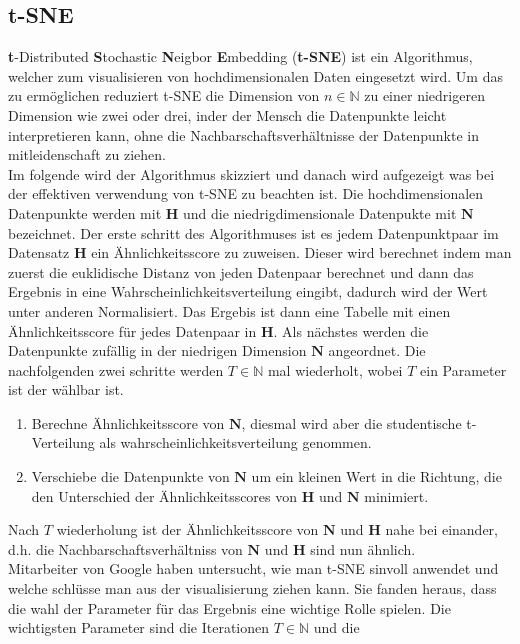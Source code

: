 \documentclass[12pt,letterpaper,ngerman]{article}
\begin{document}
\subsection{t-SNE}
{\bf t}-Distributed {\bf S}tochastic {\bf N}eigbor {\bf E}mbedding ({\bf t-SNE})
ist ein Algorithmus, welcher zum visualisieren von hochdimensionalen Daten 
eingesetzt wird. Um das zu ermöglichen reduziert t-SNE die Dimension von 
$n \in \mathbb{N}$ zu einer niedrigeren Dimension wie zwei oder drei, inder
der Mensch die Datenpunkte leicht interpretieren kann, ohne die 
Nachbarschaftsverhältnisse der Datenpunkte in mitleidenschaft zu ziehen.\\
Im folgende wird der Algorithmus skizziert und danach wird aufgezeigt was bei 
der effektiven verwendung von t-SNE zu beachten ist. Die hochdimensionalen 
Datenpunkte werden mit $\mathbf{H}$ und die niedrigdimensionale Datenpukte mit
$\mathbf{N}$ bezeichnet. Der erste schritt des Algorithmuses ist es 
jedem Datenpunktpaar im Datensatz $\mathbf{H}$ ein Ähnlichkeitsscore zu zuweisen.
Dieser wird berechnet indem man zuerst die euklidische Distanz von jeden Datenpaar
berechnet und dann das Ergebnis in eine Wahrscheinlichkeitsverteilung eingibt,
dadurch wird der Wert unter anderen Normalisiert. Das Ergebis ist dann eine 
Tabelle mit einen Ähnlichkeitsscore für jedes Datenpaar in $\mathbf{H}$. Als
nächstes werden die Datenpunkte zufällig in der niedrigen Dimension 
$\mathbf{N}$ angeordnet. Die nachfolgenden zwei schritte werden $T\in \mathbb{N}$
mal wiederholt, wobei $T$ ein Parameter ist der wählbar ist.
\begin{enumerate}
  \item Berechne Ähnlichkeitsscore von $\mathbf{N}$, diesmal wird aber die
      studentische t-Verteilung als wahrscheinlichkeitsverteilung genommen. 
  \item Verschiebe die Datenpunkte von $\mathbf{N}$ um ein kleinen Wert in
    die Richtung, die den Unterschied der Ähnlichkeitsscores von $\mathbf{H}$
    und $\mathbf{N}$ minimiert.
\end{enumerate}
Nach $T$ wiederholung ist der Ähnlichkeitsscore von $\mathbf{N}$ und $\mathbf{H}$
nahe bei einander, d.h. die Nachbarschaftsverhältniss von $\mathbf{N}$ und 
$\mathbf{H}$ sind nun ähnlich.\\
Mitarbeiter von Google haben untersucht, wie man t-SNE sinvoll anwendet und
welche schlüsse man aus der visualisierung ziehen kann. Sie fanden heraus,
dass die wahl der Parameter für das Ergebnis eine wichtige Rolle spielen.
Die wichtigsten Parameter sind die Iterationen $T\in \mathbb{N}$ und die
\end{document}
